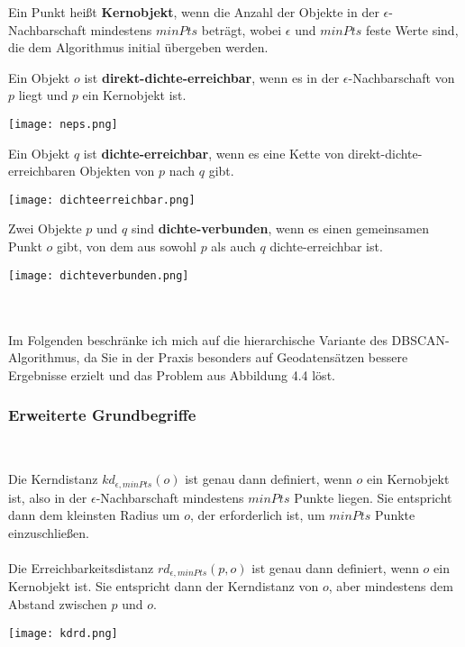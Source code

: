\documentclass[11pt,fleqn]{book}
\begin{document}
Ein Punkt heißt \textbf{Kernobjekt}, wenn die Anzahl der Objekte in der $\epsilon$-Nachbarschaft mindestens $minPts$ beträgt, wobei $\epsilon$ und $minPts$ feste Werte sind, die dem Algorithmus initial übergeben werden.

\begin{minipage}{0.6\textwidth}\raggedright
Ein Objekt $o$ ist \textbf{direkt-dichte-erreichbar}, wenn es in der $\epsilon$-Nachbarschaft von $p$ liegt und $p$ ein Kernobjekt ist.
\end{minipage}
\hfill
\begin{minipage}{0.3\textwidth}
\texttt{[image: neps.png]}
\end{minipage}


\begin{minipage}{0.6\textwidth}\raggedright
Ein Objekt $q$ ist \textbf{dichte-erreichbar}, wenn es eine Kette von direkt-dichte-erreichbaren Objekten von $p$ nach $q$ gibt.
\end{minipage}
\hfill
\begin{minipage}{0.3\textwidth}
\texttt{[image: dichteerreichbar.png]}
\end{minipage}

\begin{minipage}{0.6\textwidth}\raggedright
Zwei Objekte $p$ und $q$ sind \textbf{dichte-verbunden}, wenn es einen gemeinsamen Punkt $o$ gibt, von dem aus sowohl $p$ als auch $q$ dichte-erreichbar ist.
\end{minipage}
\hfill
\begin{minipage}{0.3\textwidth}
\texttt{[image: dichteverbunden.png]}
\end{minipage}
\\~\\
Im Folgenden beschränke ich mich auf die hierarchische Variante des DBSCAN-Algorithmus, da Sie in der Praxis besonders auf Geodatensätzen bessere Ergebnisse erzielt und das Problem aus Abbildung 4.4 löst. 

\subsubsection{Erweiterte Grundbegriffe}~
\begin{minipage}{0.50\textwidth}\raggedright
Die Kerndistanz $kd_{\epsilon, minPts}(o)$ ist genau dann definiert, wenn $o$ ein Kernobjekt ist, also in der $\epsilon$-Nachbarschaft mindestens $minPts$ Punkte liegen. Sie entspricht dann dem kleinsten Radius um $o$, der erforderlich ist, um $minPts$ Punkte einzuschließen.\\~\\

Die Erreichbarkeitsdistanz $rd_{\epsilon, minPts}(p ,o)$ ist genau dann definiert, wenn $o$ ein Kernobjekt ist. Sie entspricht dann der Kerndistanz von $o$, aber mindestens dem Abstand zwischen $p$ und $o$.
\end{minipage}
\hfill
\begin{minipage}{0.45\textwidth}
\texttt{[image: kdrd.png]}
\end{minipage}
\\
\end{document}
